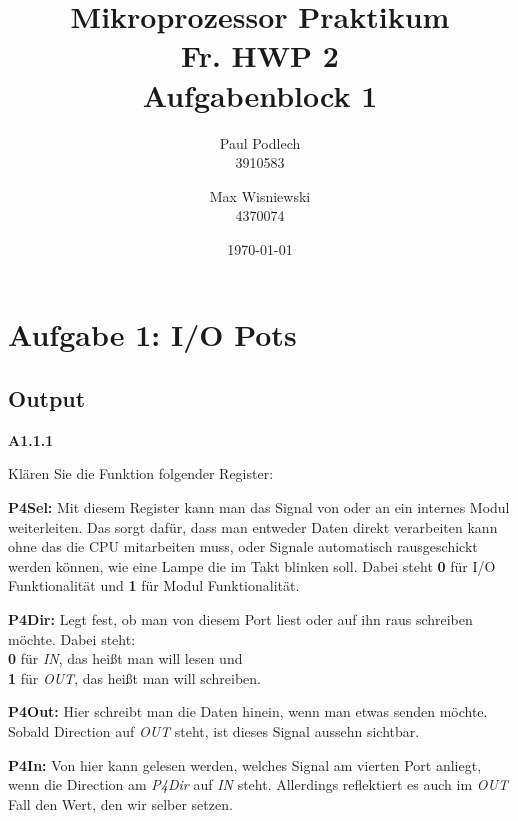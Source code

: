 \documentclass[a4paper,ngerman]{article}
\author{Paul Podlech \\ 3910583 \and Max Wisniewski\\4370074}
\title{Mikroprozessor Praktikum\\ Fr. HWP 2 \\ Aufgabenblock 1}
\date{\today}
\begin{document}
\maketitle

\newpage

\section*{Aufgabe 1: I/O Pots}

\subsection*{Output}

\begin{description}

\item{\bfseries A1.1.1}

Klären Sie die Funktion folgender Register:

\begin{description}

\item{\bfseries P4Sel:} Mit diesem Register kann man das Signal von oder an ein internes Modul weiterleiten. Das sorgt dafür, dass man entweder Daten direkt verarbeiten kann ohne das die CPU mitarbeiten muss, oder Signale automatisch rausgeschickt werden können, wie eine Lampe die im Takt blinken soll. Dabei steht \textbf{0} für I/O Funktionalität und \textbf{1} für Modul Funktionalität.

\item{\bfseries P4Dir:}  Legt fest, ob man von diesem Port liest oder auf ihn raus schreiben möchte. Dabei steht:\\
\textbf{0} für \emph{IN}, das heißt man will lesen und\\
\textbf{1} für \emph{OUT}, das heißt man will schreiben. 

\item{\bfseries P4Out:} Hier schreibt man die Daten hinein, wenn man etwas senden möchte. Sobald Direction auf \emph{OUT} steht, ist dieses Signal aussehn sichtbar.


\item{\bfseries P4In:} Von hier kann gelesen werden, welches Signal am vierten Port anliegt, wenn die Direction am \emph{P4Dir} auf \emph{IN} steht. Allerdings reflektiert es auch im \emph{OUT} Fall den Wert, den wir selber setzen.

\end{description}


\end{description}
\end{document}
